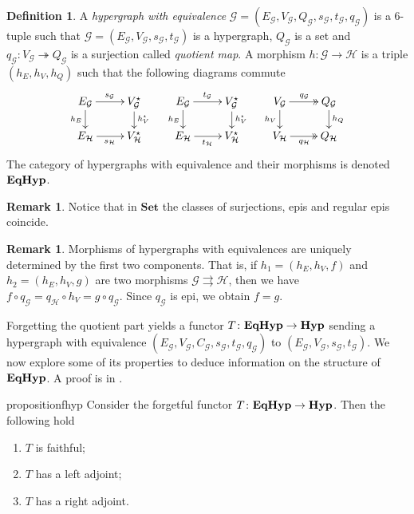 \documentclass[a4paper,UKenglish,cleveref,pdftex,amsthm,thm-restate,numberwithinsect]{cas-sc}
\theoremstyle{plain}
\theoremstyle{definition}
\newtheorem{definition}[theorem]{Definition}
\newtheorem{remark}[theorem]{Remark}
\newcommand{\Set}{\mathbf{Set}}
\newcommand{\catname}[1]{\textbf{\textup{#1}}}
\newcommand{\hyp}{\catname{Hyp}}
\newcommand{\EqHyp}{\catname{EqHyp}} %
\newcommand{\eto}{\twoheadrightarrow}
\begin{document}
\begin{definition}
	A \emph{hypergraph with equivalence} $\mathcal{G} = (E_\mathcal{G}, V_{\mathcal{G}}, Q_\mathcal{G}, s_\mathcal{G}, t_\mathcal{G}, q_\mathcal{G})$ is a 6-tuple such that $\mathcal{G} = (E_\mathcal{G}, V_{\mathcal{G}}, s_\mathcal{G}, t_\mathcal{G})$ is a hypergraph, $Q_\mathcal{G}$ is a set and $q_{\mathcal{G}}: V_{\mathcal{G}}\eto Q_{\mathcal{G}}$ is a surjection called \emph{quotient map}. 
	A morphism $h\colon \mathcal{G\to H}$ is a triple $(h_E, h_V, h_Q)$ such that the following diagrams commute
	\[\xymatrix@R=15pt{
		{E_\mathcal{G}}\ar[r]^{s_\mathcal{G}}\ar[d]_{h_E} & {V_{\mathcal{G}}^\star}\ar[d]^{h_V^\star} & {E_\mathcal{G}}\ar[r]^{t_\mathcal{G}}\ar[d]_{h_E} & {V_{\mathcal{G}}^\star}\ar[d]^{h_V^\star} & {V_\mathcal{G}}\ar@{>>}[r]^{q_\mathcal{G}}\ar[d]_{h_V} & {Q_{\mathcal{G}}} \ar[d]^{h_Q} \\
		{E_\mathcal{H}}\ar[r]_{s_\mathcal{H}} & {V_{\mathcal{H}}^\star}	& {E_\mathcal{H}}\ar[r]_{t_\mathcal{H}} & {V_{\mathcal{H}}^\star}& {V_\mathcal{H}}\ar@{>>}[r]_{q_\mathcal{H}} & {Q_\mathcal{H}}
	}\]
	The category of hypergraphs with equivalence and their morphisms is denoted $\EqHyp$.
	
\end{definition}

\begin{remark}
	Notice that in $\Set$ the classes of surjections, epis and regular epis coincide.
\end{remark}

\begin{remark}\label{rem:eqhyp_morphs}
	Morphisms of hypergraphs with equivalences are uniquely determined by the first two components. That is, if $h_1 = (h_E, h_V, f)$ and $h_2 = (h_E, h_V, g)$ are two morphisms $\mathcal{G} \rightrightarrows \mathcal{H}$, then we have
	$
	f \circ q_\mathcal{G} = q_\mathcal{H}\circ h_V =g\circ q_\mathcal{G}.
	$
	Since $q_\mathcal{G}$ is epi, we obtain $f = g$.
\end{remark}

Forgetting the quotient part yields a functor $T\colon \EqHyp \to \hyp$ sending a hypergraph with equivalence $(E_\mathcal{G}, V_{\mathcal{G}}, C_\mathcal{G}, s_\mathcal{G}, t_\mathcal{G}, q_\mathcal{G})$ to $(E_{\mathcal{G}}, V_{\mathcal{G}}, s_\mathcal{G}, t_{\mathcal{G}})$.   We now explore some of its properties to deduce information on the structure of $\EqHyp$.  
%
A proof is in .


\begin{restatable}{proposition}{fhyp}\label{prop:forghyp}  Consider the forgetful functor $T\colon \EqHyp \to \hyp$. Then the following hold
	\begin{enumerate}
		\item$T$ is faithful;
		\item $T$ has a left adjoint;
		\item $T$ has a right adjoint.
	\end{enumerate}
\end{restatable}
\end{document}
